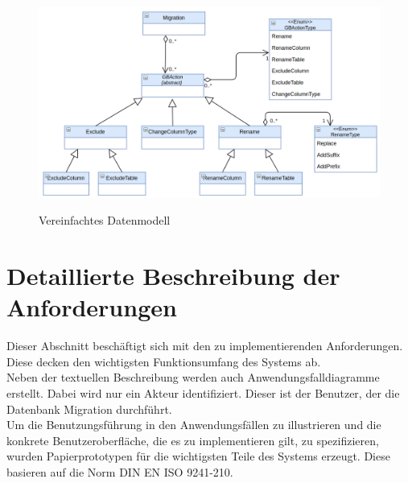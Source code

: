 \begin{figure}[H]
	\caption{Vereinfachtes Datenmodell}
	\centering
	\includegraphics[width=\textwidth]{images/sichten/abstract-datenmodell}
	\label{img:abstract-datenmodell}
\end{figure}


\section{Detaillierte Beschreibung der Anforderungen}
\label{sec:af}
Dieser Abschnitt beschäftigt sich mit den zu implementierenden Anforderungen. Diese decken den wichtigsten Funktionsumfang des Systems ab.\\
Neben der textuellen Beschreibung werden auch Anwendungsfalldiagramme erstellt. Dabei wird nur ein Akteur identifiziert. Dieser ist der Benutzer, der die Datenbank Migration durchführt. \\
Um die Benutzungsführung in den Anwendungsfällen zu illustrieren und die konkrete Benutzeroberfläche, die es zu implementieren gilt, zu spezifizieren, wurden Papierprototypen für die wichtigsten Teile des Systems erzeugt. Diese basieren  auf die Norm DIN EN ISO 9241-210.




